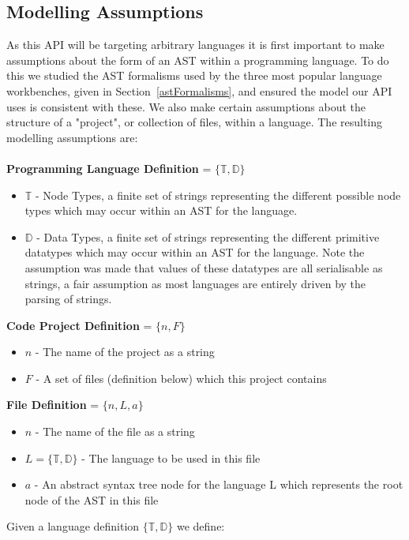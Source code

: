 \documentclass{article}
\begin{document}
\subsection{Modelling Assumptions}\label{apiAssumptions}
As this API will be targeting arbitrary languages it is first important to make assumptions about the form of an AST within a programming language. To do this we studied the AST formalisms used by the three most popular language workbenches, given in Section~\ref{astFormalisms}, and ensured the model our API uses is consistent with these. We also make certain assumptions about the structure of a "project", or collection of files, within a language. The resulting modelling assumptions are:
\\
\\
\textbf{Programming Language Definition} = $\{\mathbb{T},\mathbb{D}\}$ 
\begin{itemize}
\item $\mathbb{T}$ - Node Types, a finite set of strings representing the different possible node types which may occur within an AST for the language.
\item $\mathbb{D}$ - Data Types, a finite set of strings representing the different primitive datatypes which may occur within an AST for the language. Note the assumption was made that values of these datatypes are all serialisable as strings, a fair assumption as most languages are entirely driven by the parsing of strings.
\end{itemize}
%
\textbf{Code Project Definition} = $\{n,F \}$ 
\begin{itemize}
\item $n$ - The name of the project as a string
\item $F$ - A set of files (definition below) which this project contains
\end{itemize}
%
\textbf{File Definition} = $\{n, L, a\}$ 
\begin{itemize}
\item $n$ - The name of the file as a string
\item $L=\{\mathbb{T},\mathbb{D}\}$ - The language to be used in this file
\item $a$ - An abstract syntax tree node for the language L which represents the root node of the AST in this file
\end{itemize}
%
Given a language definition $\{\mathbb{T},\mathbb{D}\}$ we define:\\
\\
\end{document}

